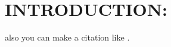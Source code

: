 \section{INTRODUCTION:}\label{sec:intro}
\linenumbers 

\blindtext[3] also you can make a citation like \cite{Campagnol2013}.